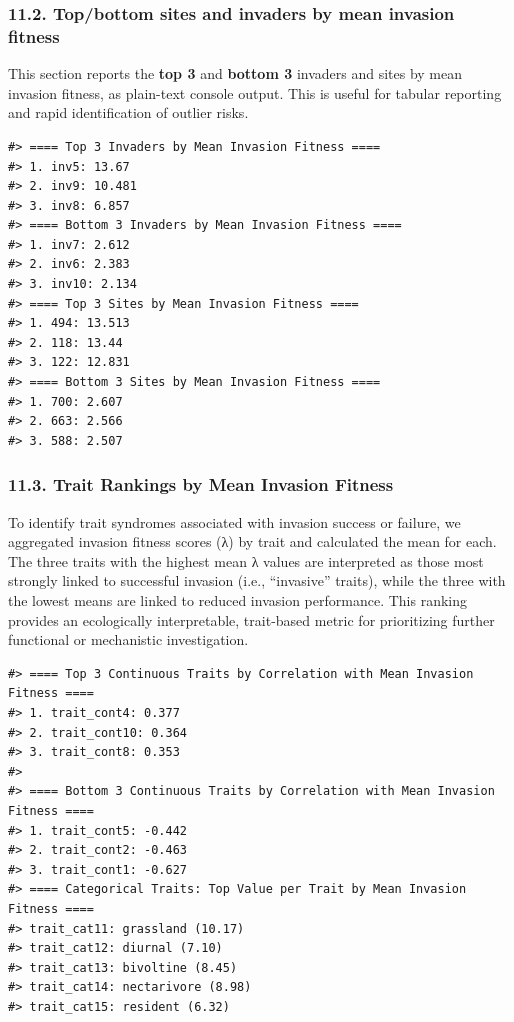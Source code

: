 \documentclass[
]{article}
\begin{document}
\hypertarget{topbottom-sites-and-invaders-by-mean-invasion-fitness}{%
\subsubsection{11.2. Top/bottom sites and invaders by mean invasion
fitness}\label{topbottom-sites-and-invaders-by-mean-invasion-fitness}}

This section reports the \textbf{top 3} and \textbf{bottom 3} invaders
and sites by mean invasion fitness, as plain-text console output. This
is useful for tabular reporting and rapid identification of outlier
risks.

\begin{verbatim}
#> ==== Top 3 Invaders by Mean Invasion Fitness ====
#> 1. inv5: 13.67
#> 2. inv9: 10.481
#> 3. inv8: 6.857
#> ==== Bottom 3 Invaders by Mean Invasion Fitness ====
#> 1. inv7: 2.612
#> 2. inv6: 2.383
#> 3. inv10: 2.134
#> ==== Top 3 Sites by Mean Invasion Fitness ====
#> 1. 494: 13.513
#> 2. 118: 13.44
#> 3. 122: 12.831
#> ==== Bottom 3 Sites by Mean Invasion Fitness ====
#> 1. 700: 2.607
#> 2. 663: 2.566
#> 3. 588: 2.507
\end{verbatim}

\hypertarget{trait-rankings-by-mean-invasion-fitness}{%
\subsubsection{11.3. Trait Rankings by Mean Invasion
Fitness}\label{trait-rankings-by-mean-invasion-fitness}}

To identify trait syndromes associated with invasion success or failure,
we aggregated invasion fitness scores (λ) by trait and calculated the
mean for each. The three traits with the highest mean λ values are
interpreted as those most strongly linked to successful invasion (i.e.,
``invasive'' traits), while the three with the lowest means are linked
to reduced invasion performance. This ranking provides an ecologically
interpretable, trait-based metric for prioritizing further functional or
mechanistic investigation.

\begin{verbatim}
#> ==== Top 3 Continuous Traits by Correlation with Mean Invasion Fitness ====
#> 1. trait_cont4: 0.377
#> 2. trait_cont10: 0.364
#> 3. trait_cont8: 0.353
#> 
#> ==== Bottom 3 Continuous Traits by Correlation with Mean Invasion Fitness ====
#> 1. trait_cont5: -0.442
#> 2. trait_cont2: -0.463
#> 3. trait_cont1: -0.627
#> ==== Categorical Traits: Top Value per Trait by Mean Invasion Fitness ====
#> trait_cat11: grassland (10.17)
#> trait_cat12: diurnal (7.10)
#> trait_cat13: bivoltine (8.45)
#> trait_cat14: nectarivore (8.98)
#> trait_cat15: resident (6.32)
\end{verbatim}
\end{document}

